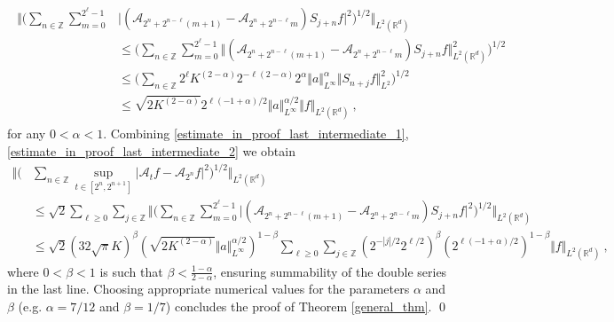 \documentclass[a4paper, reqno]{amsart}
\theoremstyle{definition}
\newcommand{\Fm}{\mathcal{A}}
\begin{document}
\begin{align}
    \begin{split}\label{estimate_in_proof_last_intermediate_2}
 \bigg\Vert \bigg( \sum_{n\in\mathbb{Z}} \sum_{m=0}^{2^\ell -1} & \big|(\Fm_{2^n+2^{n-\ell}(m+1)}-  \Fm_{2^n+2^{n-\ell}m})S_{j+n}f \big|^2\bigg)^{1/2} \bigg\Vert_{L^2(\mathbb{R}^d)} \\
    & \leq  \bigg( \sum_{n\in\mathbb{Z}} \sum_{m=0}^{2^\ell -1} \big\Vert (\Fm_{2^n+2^{n-\ell}(m+1)} -  \Fm_{2^n+2^{n-\ell}m})S_{j+n}f \big\Vert_{L^2(\mathbb{R}^d)}^2\bigg)^{1/2}  \\
    & \leq \bigg( \sum_{n\in\mathbb{Z}} 2^{\ell} K^{(2-\alpha)} 2^{-\ell(2-\alpha)} 2^\alpha\Vert a \Vert_{L^\infty}^\alpha \Vert S_{n+j}f\Vert_{L^2}^2 \bigg)^{1/2} \\
    & \leq \sqrt{2K^{(2-\alpha)}} 2^{\ell(-1+\alpha)/2} \Vert a \Vert_{L^\infty}^{\alpha/2}\Vert f \Vert_{L^2(\mathbb{R}^d)}~,
    \end{split}
\end{align}
for any $0<\alpha<1$.
Combining \eqref{estimate_in_proof_last_intermediate_1}, \eqref{estimate_in_proof_last_intermediate_2} we obtain  
\begin{align*}
    \bigg\Vert \bigg( & \sum_{n\in\mathbb{Z}} \sup_{t\in [2^n,2^{n+1}]}|\Fm_tf  - \Fm_{2^n}f|^2\bigg)^{1/2} \bigg\Vert_{L^2(\mathbb{R}^d)} \\ 
    & \leq \sqrt{2} \sum_{\ell \geq 0} \sum_{j\in\mathbb{Z}} 
    \bigg\Vert \bigg( \sum_{n\in\mathbb{Z}} \sum_{m=0}^{2^\ell -1}\big|(\Fm_{2^n+2^{n-\ell}(m+1)}  - \Fm_{2^n+2^{n-\ell}m})S_{j+n}f \big|^2\bigg)^{1/2} \bigg\Vert_{L^2(\mathbb{R}^d)} \\
    & \leq \sqrt{2} (32 \sqrt{\pi}K)^\beta (\sqrt{2K^{(2-\alpha)}} \Vert a \Vert_{L^\infty}^{\alpha/2} )^{1-\beta}\sum_{\ell \geq 0} \sum_{j\in\mathbb{Z}} (2^{-|j|/2} 2^{\ell/2})^\beta (2^{\ell(-1+\alpha)/2})^{1-\beta} \Vert f \Vert_{L^2(\mathbb{R}^d)}~,
\end{align*}
where $0<\beta<1$ is such that $\beta < \tfrac{1-\alpha}{2-\alpha}$, ensuring summability of the double series in the last line.
Choosing appropriate numerical values for the parameters $\alpha$ and $\beta$ (e.g. $\alpha=7/12$ and $\beta=1/7$) concludes the proof of Theorem \ref{general_thm}.
 \qed
\end{document}
